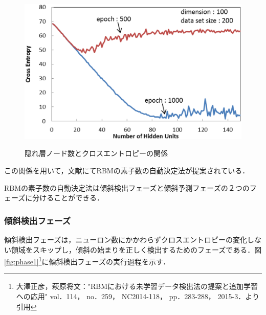 \begin{figure}[]
\begin{center}
   \includegraphics[scale=0.58]{./myimg/pre_exp1_c.eps} \\
   \caption{隠れ層ノード数とクロスエントロピーの関係}
  \label{fig:pre_exp_line}
\end{center}
\end{figure}

この関係を用いて，文献\cite{osawa}にてRBMの素子数の自動決定法が提案されている．

RBMの素子数の自動決定法は傾斜検出フェーズと傾斜予測フェーズの２つのフェーズに分けることができる．

\subsubsection{傾斜検出フェーズ}
傾斜検出フェーズは，ニューロン数にかかわらずクロスエントロピーの変化しない領域をスキップし，傾斜の始まりを正しく検出するためのフェーズである．図\ref{fig:phase1}\footnote{大澤正彦，萩原将文："RBMにおける未学習データ検出法の提案と追加学習への応用" vol．114， no．259， NC2014-118， pp．283-288， 2015-3．より引用}に傾斜検出フェーズの実行過程を示す．

